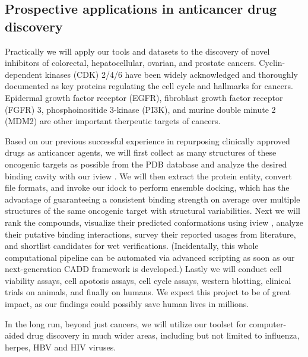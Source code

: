 \documentclass[a4paper,12pt]{article}
\begin{document}


\subsection*{Prospective applications in anticancer drug discovery}

Practically we will apply our tools and datasets to the discovery of novel inhibitors of colorectal, hepatocellular, ovarian, and prostate cancers. Cyclin-dependent kinases (CDK) 2/4/6 have been widely acknowledged and thoroughly documented as key proteins regulating the cell cycle and hallmarks for cancers. Epidermal growth factor receptor (EGFR), fibroblast growth factor receptor (FGFR) 3, phosphoinositide 3-kinase (PI3K), and murine double minute 2 (MDM2) are other important therpeutic targets of cancers.

Based on our previous successful experience in repurposing clinically approved drugs as anticancer agents, we will first collect as many structures of these oncogenic targets as possible from the PDB database \cite{537} and analyze the desired binding cavity with our iview \cite{1366}. We will then extract the protein entity, convert file formats, and invoke our idock \cite{1153} to perform ensemble docking, which has the advantage of guaranteeing a consistent binding strength on average over multiple structures of the same oncogenic target with structural variabilities. Next we will rank the compounds, visualize their predicted conformations using iview \cite{1366}, analyze their putative binding interactions, survey their reported usages from literature, and shortlist candidates for wet verifications. (Incidentally, this whole computational pipeline can be automated via advanced scripting as soon as our next-generation CADD framework is developed.) Lastly we will conduct cell viability assays, cell apotosis assays, cell cycle assays, western blotting, clinical trials on animals, and finally on humans. We expect this project to be of great impact, as our findings could possibly save human lives in millions.

In the long run, beyond just cancers, we will utilize our toolset for computer-aided drug discovery in much wider areas, including but not limited to influenza, herpes, HBV and HIV viruses.

\newpage
\linespread{0.5}
\footnotesize


\end{document}
